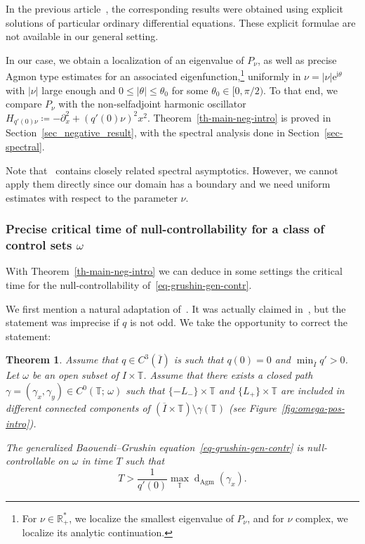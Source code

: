 \documentclass[10pt]{amsart}
\newtheorem{theo}{Theorem}[section]
\theoremstyle{definition}\newtheorem{defi}[theo]{Definition}\newtheorem{rema}[theo]{Remark}\newtheorem{exam}[theo]{Example}\newtheorem{exem}[theo]{Example}\newtheorem{nota}[theo]{Notation}
\renewcommand{\leq}{\leqslant}
\newcommand{\1}{\mathds 1}
\newcommand{\dagmon}{\mathop{\mathrm{d}}\nolimits_{\mathrm{Agm}}}
\newcommand{\R}{\mathbb{R}}
\newcommand{\T}{\mathbb{T}}
\newcommand{\eu}{\mathrm e}
\newcommand{\iu}{\mathrm i}
\newcommand{\g}{\gamma}
\renewcommand{\th}{\theta}
\renewcommand{\o}{\omega}
\begin{document}
In the previous article~\cite{DK20}, the corresponding results were obtained using explicit solutions of particular ordinary differential equations. These explicit formulae are not available in our general setting.

In our case, we obtain a localization of an eigenvalue of $P_\nu$, as well as precise Agmon type estimates for an associated eigenfunction,\footnote{For $\nu \in \R_+^*$, we localize the smallest eigenvalue of $P_\nu$, and for $\nu$ complex, we localize its analytic continuation.} uniformly in $\nu = \vert \nu \vert \eu^{\iu \theta}$ with $\vert \nu \vert$ large enough and $0 \leq \vert \theta \vert \leq \theta_0$ for some $\th_0 \in [0, {\pi}/{2})$. To that end, we compare $P_\nu$ with the non-selfadjoint harmonic oscillator $H_{q'(0)\nu}\coloneqq -\partial_x^2 + (q'(0)\nu)^2 x^2$. Theorem~\ref{th-main-neg-intro} is proved in Section~\ref{sec_negative_result}, with the spectral analysis done in Section~\ref{sec-spectral}.

Note that~\cite{HSS05} contains closely related spectral asymptotics. However, we cannot apply them directly since our domain has a boundary and we need uniform estimates with respect to the parameter $\nu$.

\subsubsection{Precise critical time of null-controllability for a class of control sets $\o$}

With Theorem~\ref{th-main-neg-intro} we can deduce in some settings the critical time for the null-controllability of~\eqref{eq-grushin-gen-contr}.


We first mention a natural adaptation of~\cite[Theorem~3.1]{DK20}. It was actually claimed in~\cite[Remark~3.2]{DK20}, but the statement was imprecise if $q$ is not odd. We take the opportunity to correct the statement:

\begin{theo}\label{th-main-pos-intro}
Assume that $q\in C^3(\overline I)$ is such that $q(0) = 0$ and $\min_{\overline I} q' >0$. Let $\o$ be an open subset of $I\times \T$. Assume that there exists a closed path $\gamma = (\g_x, \g_y) \in C^0(\T;\, \omega)$ such that $\{-L_-\}\times \T$ and $\{L_+\}\times \T$ are included in different connected components of $(\overline I\times\T) \setminus \g(\T)$ (see Figure~\ref{fig:omega-pos-intro}).

The generalized Baouendi--Grushin equation~\eqref{eq-grushin-gen-contr} is null-controllable on $\o$ in time $T$ such that
\[
T> \frac{1}{q'(0)}\max_\T\dagmon(\g_x).
\]
\end{theo}
\end{document}
